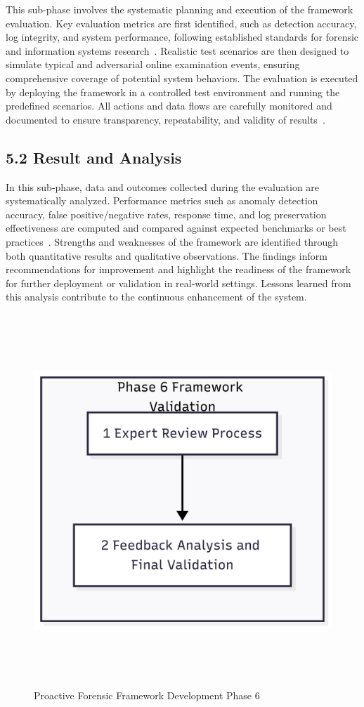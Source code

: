 This sub-phase involves the systematic planning and execution of the framework evaluation. Key evaluation metrics are first identified, such as detection accuracy, log integrity, and system performance, following established standards for forensic and information systems research~\cite{hevner2004design, nist80092}. Realistic test scenarios are then designed to simulate typical and adversarial online examination events, ensuring comprehensive coverage of potential system behaviors. The evaluation is executed by deploying the framework in a controlled test environment and running the predefined scenarios. All actions and data flows are carefully monitored and documented to ensure transparency, repeatability, and validity of results~\cite{sommerville2016software}.

\subsection{5.2 Result and Analysis}

In this sub-phase, data and outcomes collected during the evaluation are systematically analyzed. Performance metrics such as anomaly detection accuracy, false positive/negative rates, response time, and log preservation effectiveness are computed and compared against expected benchmarks or best practices~\cite{pressman2015software}. Strengths and weaknesses of the framework are identified through both quantitative results and qualitative observations. The findings inform recommendations for improvement and highlight the readiness of the framework for further deployment or validation in real-world settings. Lessons learned from this analysis contribute to the continuous enhancement of the system.
\begin{figure}[H]
    \centering
    \includegraphics[height=14cm]{figure/framework-development-phase-6.png}
    \caption{Proactive Forensic Framework Development Phase 6}
    \label{fig:framework-development-phase-6}
\end{figure}

